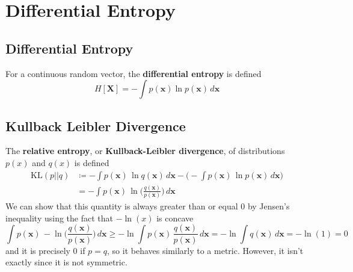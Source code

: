 \documentclass{article}
\begin{document}
\section{Differential Entropy}

  \subsection{Differential Entropy}

    \begin{definition}
      For a continuous random vector, the \textbf{differential entropy} is defined 
      \begin{equation}
        H[\mathbf{X}] = - \int p(\mathbf{x}) \ln{p(\mathbf{x})} \,d\mathbf{x}
      \end{equation}
    \end{definition}

  \subsection{Kullback Leibler Divergence}

    The \textbf{relative entropy}, or \textbf{Kullback-Leibler divergence}, of distributions $p(x)$ and $q(x)$ is defined 
    \begin{align*}
      \mathrm{KL}(p || q) & \coloneqq - \int p(\mathbf{x}) \, \ln{q(\mathbf{x})} \,d\mathbf{x} - \bigg( - \int p(\mathbf{x}) \, \ln{p(\mathbf{x})} \,d\mathbf{x} \bigg) \\
      & = - \int p(\mathbf{x}) \, \ln \bigg( \frac{q(\mathbf{x})}{p(\mathbf{x})} \bigg) \,d\mathbf{x} 
    \end{align*}
    We can show that this quantity is always greater than or equal $0$ by Jensen's inequality using the fact that $-\ln(x)$ is concave
    \begin{equation}
      \int p(\mathbf{x}) \, -\ln \bigg( \frac{q(\mathbf{x})}{p(\mathbf{x})} \bigg) \,d\mathbf{x} \geq -\ln \int p(\mathbf{x}) \, \frac{q(\mathbf{x})}{p(\mathbf{x})} \,d\mathbf{x} = -\ln \int q(\mathbf{x}) \,d\mathbf{x} = -\ln(1) = 0
    \end{equation}
    and it is precisely $0$ if $p = q$, so it behaves similarly to a metric. However, it isn't exactly since it is not symmetric. 
\end{document}
